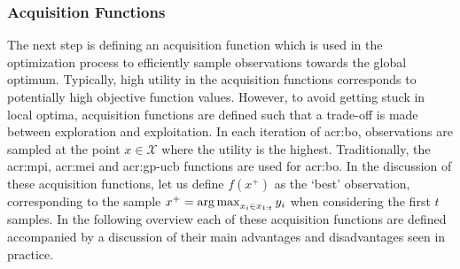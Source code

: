 

\subsubsection*{Acquisition Functions}
\label{sec:bayesian-optimization-acquisition}
The next step is defining an acquisition function which is used in the optimization process to efficiently sample observations towards the global optimum.
Typically, high utility in the acquisition functions corresponds to potentially high objective function values.
However, to avoid getting stuck in local optima, acquisition functions are defined such that a trade-off is made between exploration and exploitation.
In each iteration of \acrlong{acr:bo}, observations are sampled at the point $x \in \mathcal{X}$ where the utility is the highest.
Traditionally, the \acrfull{acr:mpi}, \acrfull{acr:mei} and \acrfull{acr:gp-ucb} functions are used for \acrlong{acr:bo}.
In the discussion of these acquisition functions, let us define $f(x^+)$ as the `best' observation, corresponding to the sample $x^+ = \operatorname*{arg\,max}_{x_i \in x_{1:t}} y_i$ when considering the first $t$ samples.
In the following overview each of these acquisition functions are defined accompanied by a discussion of their main advantages and disadvantages seen in practice.

